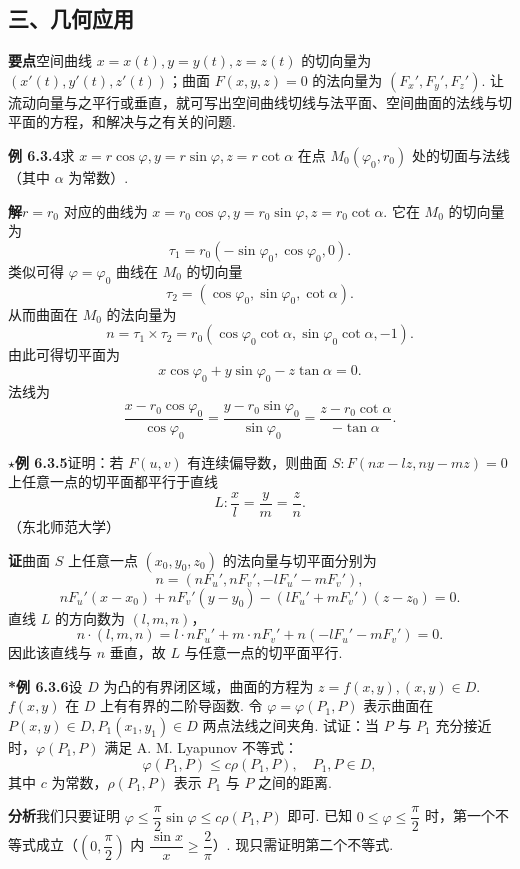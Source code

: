 \documentclass[UTF8,12pt,a4paper,fontset=fandol]{ctexart}
\begin{document}
\subsection*{三、几何应用}

\noindent\textbf{要点}\quad 空间曲线 $x=x(t),y=y(t),z=z(t)$ 的切向量为 $(x'(t),y'(t),z'(t))$；曲面 $F(x,y,z)=0$ 的法向量为 $(F_x',F_y',F_z')$. 让流动向量与之平行或垂直，就可写出空间曲线切线与法平面、空间曲面的法线与切平面的方程，和解决与之有关的问题.

\noindent\textbf{例 6.3.4}\quad 求 $x=r\cos\varphi,y=r\sin\varphi,z=r\cot\alpha$ 在点 $M_0(\varphi_0,r_0)$ 处的切面与法线（其中 $\alpha$ 为常数）.

\noindent\textbf{解}\quad $r=r_0$ 对应的曲线为 $x=r_0\cos\varphi,y=r_0\sin\varphi,z=r_0\cot\alpha$. 它在 $M_0$ 的切向量为
\[
  \tau_1=r_0(-\sin\varphi_0,\cos\varphi_0,0).
\]
类似可得 $\varphi=\varphi_0$ 曲线在 $M_0$ 的切向量
\[
  \tau_2=(\cos\varphi_0,\sin\varphi_0,\cot\alpha).
\]
从而曲面在 $M_0$ 的法向量为
\[
  n=\tau_1\times\tau_2
  =r_0(\cos\varphi_0\cot\alpha,\sin\varphi_0\cot\alpha,-1).
\]
由此可得切平面为
\[
  x\cos\varphi_0+y\sin\varphi_0-z\tan\alpha=0.
\]
法线为
\[
  \frac{x-r_0\cos\varphi_0}{\cos\varphi_0}
  =\frac{y-r_0\sin\varphi_0}{\sin\varphi_0}
  =\frac{z-r_0\cot\alpha}{-\tan\alpha}.
\]

\noindent\textbf{\ensuremath{\star}例 6.3.5}\quad 证明：若 $F(u,v)$ 有连续偏导数，则曲面 $S:F(nx-lz,ny-mz)=0$ 上任意一点的切平面都平行于直线
\[
  L:\frac xl=\frac ym=\frac zn.
\]
（东北师范大学）

\noindent\textbf{证}\quad 曲面 $S$ 上任意一点 $(x_0,y_0,z_0)$ 的法向量与切平面分别为
\[
  n=(nF_u',nF_v',-lF_u'-mF_v'),
\]
\[
  nF_u'(x-x_0)+nF_v'(y-y_0)-(lF_u'+mF_v')(z-z_0)=0.
\]
直线 $L$ 的方向数为 $(l,m,n)$，
\[
  n\cdot(l,m,n)=l\cdot nF_u'+m\cdot nF_v'
  +n(-lF_u'-mF_v')=0.
\]
因此该直线与 $n$ 垂直，故 $L$ 与任意一点的切平面平行.

\noindent\textbf{*例 6.3.6}\quad 设 $D$ 为凸的有界闭区域，曲面的方程为 $z=f(x,y),(x,y)\in D$. $f(x,y)$ 在 $D$ 上有有界的二阶导函数. 令 $\varphi=\varphi(P_1,P)$ 表示曲面在 $P(x,y)\in D,P_1(x_1,y_1)\in D$ 两点法线之间夹角. 试证：当 $P$ 与 $P_1$ 充分接近时，$\varphi(P_1,P)$ 满足 A. M. Lyapunov 不等式：
\[
  \varphi(P_1,P)\le c\rho(P_1,P),\quad P_1,P\in D,
\]
其中 $c$ 为常数，$\rho(P_1,P)$ 表示 $P_1$ 与 $P$ 之间的距离.

\noindent\textbf{分析}\quad 我们只要证明 $\varphi\le\dfrac\pi2\sin\varphi\le c\rho(P_1,P)$ 即可. 已知 $0\le\varphi\le\dfrac\pi2$ 时，第一个不等式成立（$\left(0,\dfrac\pi2\right)$ 内 $\dfrac{\sin x}x\ge\dfrac2\pi$）. 现只需证明第二个不等式.
\end{document}
